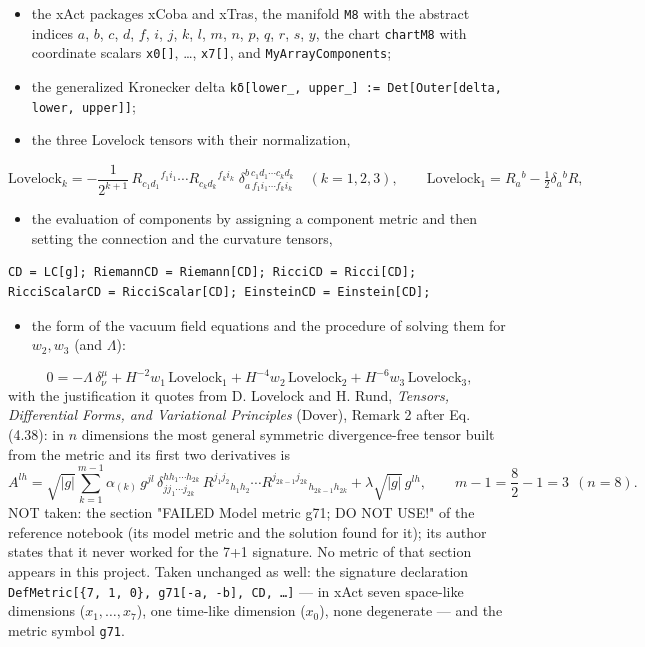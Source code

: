 \documentclass[10pt,a4paper]{article}
\begin{document}
\begin{itemize}
\item the xAct packages xCoba and xTras, the manifold \texttt{M8} with the abstract indices $a$, $b$, $c$, $d$, $f$, $i$, $j$, $k$, $l$, $m$, $n$, $p$, $q$, $r$, $s$, $y$, the chart \texttt{chartM8} with coordinate scalars \texttt{x0[]}, …, \texttt{x7[]}, and \texttt{MyArrayComponents};
\item the generalized Kronecker delta \texttt{kδ[lower\_\allowbreak{}, upper\_\allowbreak{}] := Det[Outer[delta, lower, upper]]};
\item the three Lovelock tensors with their normalization,
\end{itemize}
\begin{equation*}
\mathrm{Lovelock}_k=-\frac{1}{2^{k+1}}\,R_{c_1d_1}{}^{f_1i_1}\cdots R_{c_kd_k}{}^{f_ki_k}\;\delta^{b\,c_1d_1\cdots c_kd_k}_{a\,f_1i_1\cdots f_ki_k}\quad(k=1,2,3),\qquad \mathrm{Lovelock}_1=R_a{}^b-\tfrac12\delta_a{}^bR,
\end{equation*}
\begin{itemize}
\item the evaluation of components by assigning a component metric and then setting the connection and the curvature tensors,
\end{itemize}
\begin{Verbatim}[fontsize=\small,frame=single,framesep=2mm]
CD = LC[g]; RiemannCD = Riemann[CD]; RicciCD = Ricci[CD];
RicciScalarCD = RicciScalar[CD]; EinsteinCD = Einstein[CD];
\end{Verbatim}
\begin{itemize}
\item the form of the vacuum field equations and the procedure of solving them for $w_2,w_3$ (and $\Lambda$):
\end{itemize}
\begin{equation*}
0=-\Lambda\,\delta^\mu_\nu+H^{-2}w_1\,\mathrm{Lovelock}_1+H^{-4}w_2\,\mathrm{Lovelock}_2+H^{-6}w_3\,\mathrm{Lovelock}_3,
\end{equation*}
with the justification it quotes from D. Lovelock and H. Rund, \emph{Tensors, Differential Forms, and Variational Principles} (Dover), Remark 2 after Eq. (4.38): in $n$ dimensions the most general symmetric divergence-free tensor built from the metric and its first two derivatives is
\begin{equation*}
A^{lh}=\sqrt{|g|}\sum_{k=1}^{m-1}\alpha_{(k)}\,g^{jl}\,\delta^{h h_1\cdots h_{2k}}_{j j_1\cdots j_{2k}}\,R^{j_1j_2}{}_{h_1h_2}\cdots R^{j_{2k-1}j_{2k}}{}_{h_{2k-1}h_{2k}}+\lambda\sqrt{|g|}\,g^{lh},\qquad m-1=\frac82-1=3\ \ (n=8).
\end{equation*}
NOT taken: the section "FAILED Model metric g71; DO NOT USE!" of the reference notebook (its model metric and the solution found for it); its author states that it never worked for the 7+1 signature. No metric of that section appears in this project. Taken unchanged as well: the signature declaration \texttt{DefMetric[\{7, 1, 0\}, g71[-a, -b], CD, …]} — in xAct seven space-like dimensions ($x_1,\dots,x_7$), one time-like dimension ($x_0$), none degenerate — and the metric symbol \texttt{g71}.
\end{document}
